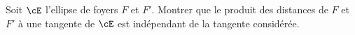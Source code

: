 \begin{enonce}
\begin{exercise}[ID={RMS 122-2 E558 Mines-Ponts PSI},subtitle={},tags={}]
Soit $\cE$ l'ellipse de foyers $F$ et $F'$.
Montrer que le produit des distances de $F$ et $F'$ à une tangente de $\cE$ est indépendant de la tangente considérée.
\end{exercise}
\begin{solution}
\end{solution}
\end{enonce}
